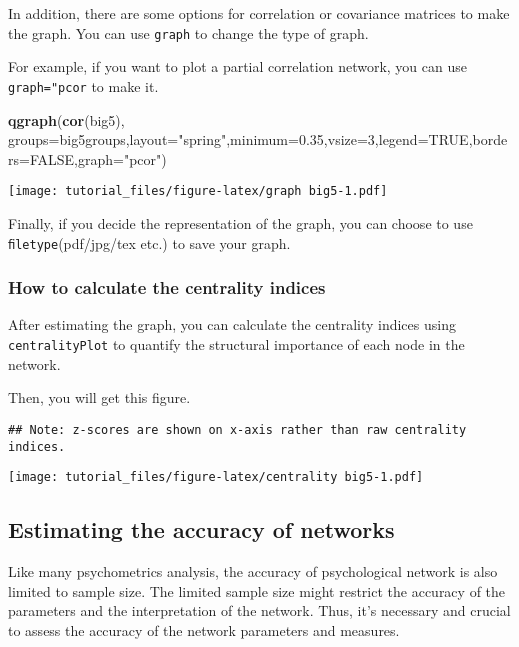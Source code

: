 \documentclass[]{article}
\newenvironment{Shaded}{\begin{snugshade}}{\end{snugshade}}
\newcommand{\KeywordTok}[1]{\textcolor[rgb]{0.13,0.29,0.53}{\textbf{#1}}}
\newcommand{\DataTypeTok}[1]{\textcolor[rgb]{0.13,0.29,0.53}{#1}}
\newcommand{\DecValTok}[1]{\textcolor[rgb]{0.00,0.00,0.81}{#1}}
\newcommand{\FloatTok}[1]{\textcolor[rgb]{0.00,0.00,0.81}{#1}}
\newcommand{\StringTok}[1]{\textcolor[rgb]{0.31,0.60,0.02}{#1}}
\newcommand{\OtherTok}[1]{\textcolor[rgb]{0.56,0.35,0.01}{#1}}
\newcommand{\NormalTok}[1]{#1}
\begin{document}
In addition, there are some options for correlation or covariance
matrices to make the graph. You can use \texttt{graph} to change the
type of graph.

For example, if you want to plot a partial correlation network, you can
use \texttt{graph="pcor} to make it.

\begin{Shaded}
\begin{Highlighting}[]
\KeywordTok{qgraph}\NormalTok{(}\KeywordTok{cor}\NormalTok{(big5), }\DataTypeTok{groups=}\NormalTok{big5groups,}\DataTypeTok{layout=}\StringTok{"spring"}\NormalTok{,}\DataTypeTok{minimum=}\FloatTok{0.35}\NormalTok{,}\DataTypeTok{vsize=}\DecValTok{3}\NormalTok{,}\DataTypeTok{legend=}\OtherTok{TRUE}\NormalTok{,}\DataTypeTok{borders=}\OtherTok{FALSE}\NormalTok{,}\DataTypeTok{graph=}\StringTok{"pcor"}\NormalTok{)}
\end{Highlighting}
\end{Shaded}

\texttt{[image: tutorial\_files/figure-latex/graph big5-1.pdf]}

Finally, if you decide the representation of the graph, you can choose
to use \texttt{ﬁletype}(pdf/jpg/tex etc.) to save your graph.

\subsubsection{How to calculate the centrality
indices}\label{how-to-calculate-the-centrality-indices}

After estimating the graph, you can calculate the centrality indices
using \texttt{centralityPlot} to quantify the structural importance of
each node in the network.

Then, you will get this figure.

\begin{verbatim}
## Note: z-scores are shown on x-axis rather than raw centrality indices.
\end{verbatim}

\texttt{[image: tutorial\_files/figure-latex/centrality big5-1.pdf]}

\subsection{Estimating the accuracy of
networks}\label{estimating-the-accuracy-of-networks}

Like many psychometrics analysis, the accuracy of psychological network
is also limited to sample size. The limited sample size might restrict
the accuracy of the parameters and the interpretation of the network.
Thus, it's necessary and crucial to assess the accuracy of the network
parameters and measures.
\end{document}
